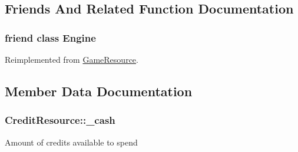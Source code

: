 \subsection{Friends And Related Function Documentation}
\subsubsection[{Engine}]{\setlength{\rightskip}{0pt plus 5cm}friend class {\bf Engine}\hspace{0.3cm}{\ttfamily [friend]}}\label{class_credit_resource_a3e1914489e4bed4f9f23cdeab34a43dc}


Reimplemented from \hyperlink{class_game_resource_a3e1914489e4bed4f9f23cdeab34a43dc}{Game\-Resource}.



\subsection{Member Data Documentation}
\subsubsection[{\-\_\-cash}]{ Credit\-Resource\-::\-\_\-cash\hspace{0.3cm}{\ttfamily [private]}}\label{class_credit_resource_adfd3f9d57e1a890eca32b6944b98b376}
Amount of credits available to spend 